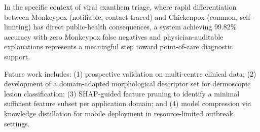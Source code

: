 \documentclass[preprint,12pt]{elsarticle}
\begin{document}
In the specific context of viral exanthem triage, where rapid
differentiation between Monkeypox (notifiable, contact-traced) and
Chickenpox (common, self-limiting) has direct public-health consequences,
a system achieving 99.82\% accuracy with zero Monkeypox false negatives
and physician-auditable explanations represents a meaningful step toward
point-of-care diagnostic support.

Future work includes: (1) prospective validation on multi-centre clinical
data; (2) development of a domain-adapted morphological descriptor set
for dermoscopic lesion classification; (3) SHAP-guided feature pruning
to identify a minimal sufficient feature subset per application domain;
and (4) model compression via knowledge distillation for mobile deployment
in resource-limited outbreak settings.




\end{document}
